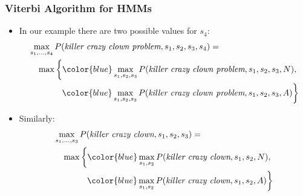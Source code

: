 \begin{frame}
\frametitle{Viterbi Algorithm for HMMs}
\begin{itemize}[<+->]
\item In our example there are two possible values for $s_4$:
\begin{eqnarray*}
\lefteqn{\max_{s_1, \ldots, s_4} P(\textit{killer crazy clown problem}, s_1, s_2, s_3, s_4) =} \\
&& \max \left\{ {\color{blue} \max_{s_1, s_2, s_3} P(\textit{killer crazy clown problem}, s_1, s_2, s_3, N) }, \right. \\
&&  \left. {\color{blue} \max_{s_1, s_2, s_3} P(\textit{killer crazy clown problem}, s_1, s_2, s_3, A) } \right\}
\end{eqnarray*}
\item Similarly:
\begin{eqnarray*}
\lefteqn{\max_{s_1, \ldots, s_3} P(\textit{killer crazy clown}, s_1, s_2, s_3) =} \\
&& \max \left\{ {\color{blue} \max_{s_1, s_2} P(\textit{killer crazy clown}, s_1, s_2, N) }, \right. \\
&&  \left. {\color{blue} \max_{s_1, s_2} P(\textit{killer crazy clown}, s_1, s_2, A) } \right\}
\end{eqnarray*}
\end{itemize}
\end{frame}

